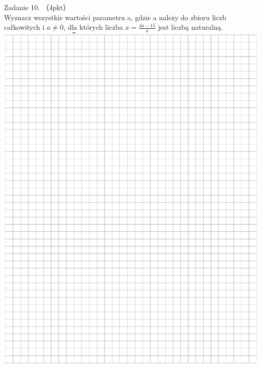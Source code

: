 \documentclass[10pt]{article}
\begin{document}
Zadanie 10. （4pkt）\\
Wyznacz wszystkie wartości parametru a, gdzie a należy do zbioru liczb całkowitych i \(a \neq 0\), dla których liczba \(x=\frac{4 a-15}{a}\) jest liczbą naturalną.\\
\includegraphics[max width=\textwidth, center]{2024_11_21_439e1d90cd1e7f928ae2g-08}
\end{document}
